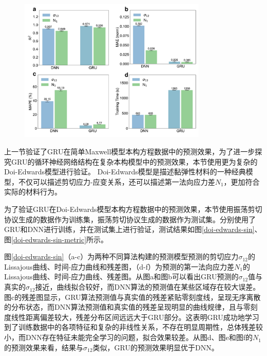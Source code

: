 \begin{figure}[htbp]
  \centering
  \includegraphics[width=0.8\textwidth]{Fig/doi-edwards-sin-metrics.pdf}
\end{figure}

上一节验证了GRU在简单Maxwell模型本构方程数据中的预测效果，为了进一步探究GRU的循环神经网络结构在复杂本构模型中的预测效果，本节使用更为复杂的Doi-Edwards模型进行验证。
Doi-Edwards模型是描述黏弹性材料的一种经典模型，不仅可以描述剪切应力-应变关系，还可以描述第一法向应力差$N_1$，更加符合实际的材料行为。

为了验证GRU在Doi-Edwards模型本构方程数据中的预测效果，本节使用振荡剪切协议生成的数据作为训练集，振荡剪切协议生成的数据作为测试集。分别使用了GRU和DNN进行训练，并在测试集上进行验证，测试结果如图\ref{doi-edwards-sin}、图\ref{doi-edwards-sin-metric}所示。

图\ref{doi-edwards-sin}（a-c）为两种不同算法构建的预测模型预测的剪切应力$\sigma_{12}$的Lissajous曲线、时间-应力曲线和残差图，（d-f）为预测的第一法向应力差$N_1$的Lissajous曲线、时间-应力曲线、残差图。从图a和图b可以看出GRU预测的$\sigma_{12}$值与真实的$\sigma_{12}$接近，曲线拟合较好，而DNN算法的预测值在某些区域存在较大误差。图c的残差图显示，GRU算法预测值与真实值的残差紧贴零刻度线，呈现无序离散的分布状态，而DNN算法预测值和真实值的残差呈现明显的曲线规律，且与零刻度线性距离偏差较大，残差分布区间远远大于GRU部分。这表明GRU成功地学习到了训练数据中的各项特征和复杂的非线性关系，不存在明显周期性，总体残差较小，而DNN存在特征未能完全学习的问题，拟合效果较差。从图d、图e和图f的$N_1$的预测效果来看，结果与$\sigma_{12}$类似，GRU的预测效果明显优于DNN。

